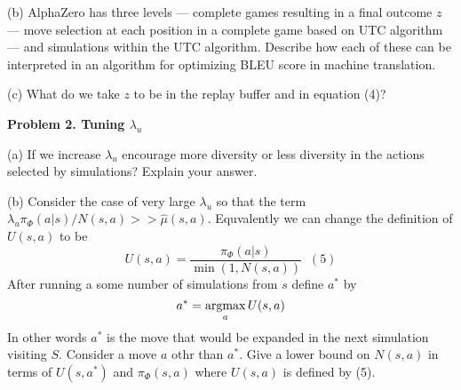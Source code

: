 \medskip
(b) AlphaZero has three levels --- complete games resulting in a final outcome $z$ --- move selection at each position in a complete game based on UTC algorithm ---
and simulations within the UTC algorithm.  Describe how each of these can be interpreted in an algorithm for optimizing BLEU score in machine translation.


\medskip
(c) What do we take $z$ to be in the replay buffer and in equation (4)?

  

\bigskip
{\bf Problem 2. Tuning $\lambda_u$}
    
\medskip
(a) If we increase $\lambda_u $ encourage more diversity or less diversity in the actions selected by simulations? Explain your answer.


\medskip
(b) Consider the case of very large $\lambda_u$ so that the term $\lambda_u \pi_\Phi(a|s)/N(s,a) >> \hat{\mu}(s,a)$.  Equvalently we can change the definition
of $U(s,a)$ to be
$$U(s,a) = \frac{\pi_\Phi(a|s)}{\min(1,N(s,a))} \;\;(5)$$
After running a some number of simulations from $s$ define $a^*$ by
$$a^* = \operatorname*{argmax}_a U(s,a)$$
In other words $a^*$ is the move that would be expanded in the next simulation visiting $S$.
Consider a move $a$ othr than $a^*$.  Give a lower bound on $N(s,a)$ in terms of $U(s,a^*)$ and $\pi_\Phi(s,a)$ where $U(s,a)$ is defined by (5).



